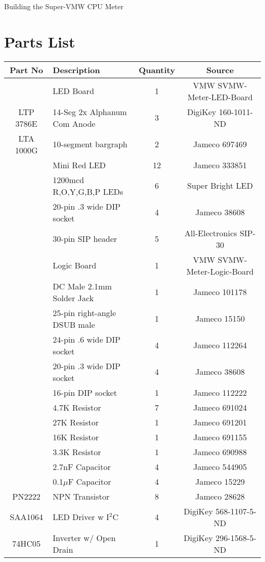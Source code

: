 \documentclass[11pt]{article}
\begin{document}
Building the Super-VMW CPU Meter

\section{Parts List}

\begin{tabular}{|c|l|c|c|}
\hline
Part No   &  Description    &  Quantity    &   Source \\
\hline
\hline

          &  LED Board                 & 1  & VMW SVMW-Meter-LED-Board\\ %
LTP 3786E &  14-Seg 2x Alphanum Com Anode & 3 &  DigiKey 160-1011-ND \\ %
LTA 1000G &  10-segment bargraph       & 2  &  Jameco 697469 \\ %
          &  Mini Red LED              & 12 &  Jameco 333851 \\ %
	  &  1200mcd R,O,Y,G,B,P LEDs  & 6  &  Super Bright LED \\ %
	  &  20-pin .3 wide DIP socket & 4  &  Jameco 38608 \\ %
	  &  30-pin SIP header         & 5  &  All-Electronics SIP-30 \\ %
\hline
\hline
          & Logic Board                & 1  & VMW SVMW-Meter-Logic-Board \\ %
	  & DC Male 2.1mm Solder Jack  & 1  &  Jameco 101178 \\ %
	  & 25-pin right-angle DSUB male & 1  &  Jameco 15150 \\ %
	  & 24-pin .6 wide DIP socket  & 4  &  Jameco 112264 \\ %
	  & 20-pin .3 wide DIP socket  & 4  &  Jameco 38608 \\ %
	  & 16-pin DIP socket          & 1  &  Jameco 112222 \\ %
	  & 4.7K Resistor              & 7  &  Jameco 691024 \\ %
	  & 27K Resistor               & 1  &  Jameco 691201 \\ %
	  & 16K Resistor               & 1  &  Jameco 691155 \\ %
	  & 3.3K Resistor              & 1  &  Jameco 690988 \\ %
	  & 2.7nF Capacitor            & 4  &  Jameco 544905 \\ %
	  & 0.1$\mu$F Capacitor        & 4  &  Jameco 15229 \\ %
PN2222    & NPN Transistor             & 8  &  Jameco 28628 \\ %
SAA1064   & LED Driver w I$^{2}$C      & 4  &  DigiKey 568-1107-5-ND \\ %
74HC05    & Inverter w/ Open Drain     & 1  &  DigiKey 296-1568-5-ND \\ %



\end{tabular}
\end{document}
